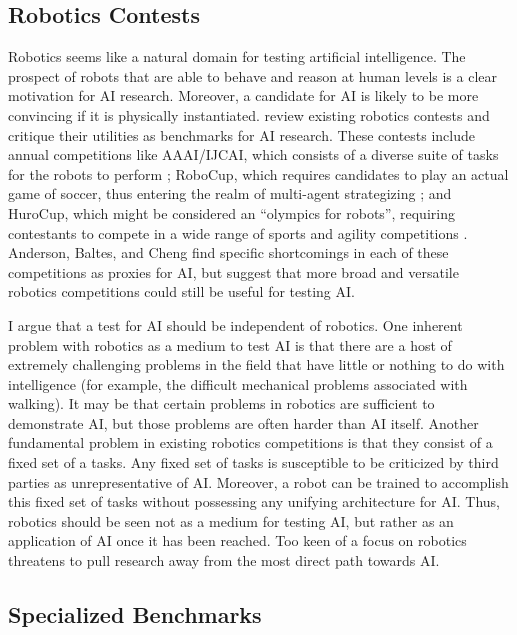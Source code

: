 \subsection{Robotics Contests}

Robotics seems like a natural domain for testing artificial intelligence. The prospect of robots that are able to behave and reason at human levels is a clear motivation for AI research. Moreover, a candidate for AI is likely to be more convincing if it is physically instantiated. \citet{anderson2011robotics} review existing robotics contests and critique their utilities as benchmarks for AI research. These contests include annual competitions like AAAI/IJCAI, which consists of a diverse suite of tasks for the robots to perform  \citep{balch2002ten}; RoboCup, which requires candidates to play an actual game of soccer, thus entering the realm of multi-agent strategizing  \citep{kitano1997robocup}; and HuroCup, which might be considered an ``olympics for robots'', requiring contestants to compete in a wide range of sports and agility competitions  \citep{baltes2009hurocup}. Anderson, Baltes, and Cheng find specific shortcomings in each of these competitions as proxies for AI, but suggest that more broad and versatile robotics competitions could still be useful for testing AI.

I argue that a test for AI should be independent of robotics. One inherent problem with robotics as a medium to test AI is that there are a host of extremely challenging problems in the field that have little or nothing to do with intelligence (for example, the difficult mechanical problems associated with walking). It may be that certain problems in robotics are sufficient to demonstrate AI, but those problems are often harder than AI itself. Another fundamental problem in existing robotics competitions is that they consist of a fixed set of a tasks. Any fixed set of tasks is susceptible to be criticized by third parties as unrepresentative of AI. Moreover, a robot can be trained to accomplish this fixed set of tasks without possessing any unifying architecture for AI. Thus, robotics should be seen not as a medium for testing AI, but rather as an application of AI once it has been reached. Too keen of a focus on robotics threatens to pull research away from the most direct path towards AI. 

\subsection{Specialized Benchmarks}

